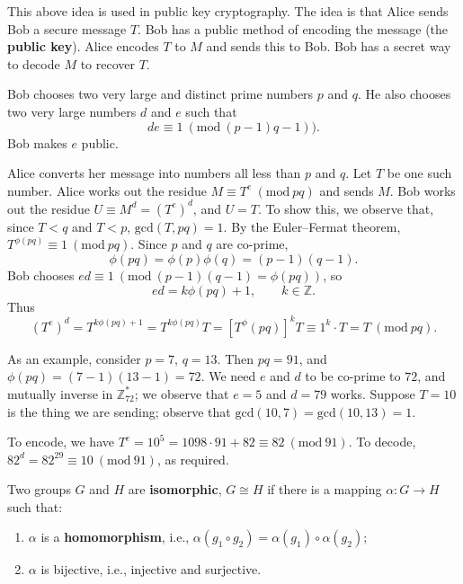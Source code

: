 \documentclass[letter-paper]{tufte-book}
\newenvironment{example}[1][Example]{\begin{trivlist}
\item[\hskip \labelsep {\bfseries #1}]}{\end{trivlist}}
\newcommand\Def[1]{\textbf{#1}}
\begin{document}
\begin{example}[Example: public key cryptography]
  This above idea is used in public key cryptography. The idea is that Alice
  sends Bob a secure message $T$. Bob has a public method of encoding the
  message (the \Def{public key}). Alice encodes $T$ to $M$ and sends this to
  Bob. Bob has a secret way to decode $M$ to recover $T$.
  
  Bob chooses two very large and distinct prime numbers $p$ and $q$. He also
  chooses two very large numbers $d$ and $e$ such that
  \begin{equation*}
    de\equiv1\ (\mbox{mod}\ (p-1)q-1)).
  \end{equation*}
  Bob makes $e$ public.
  
  Alice converts her message into numbers all less than $p$ and $q$. Let $T$ be
  one such number. Alice works out the residue $M\equiv T^e\ (\mbox{mod}\ pq)$
  and sends $M$. Bob works out the residue $U\equiv M^d=(T^e)^d$, and $U=T$. To
  show this, we observe that, since $T<q$ and $T<p$, $\mbox{gcd}(T,pq)=1$. By
  the Euler--Fermat theorem, $T^{\phi(pq)}\equiv1\ (\mbox{mod}\ pq)$. Since $p$
  and $q$ are co-prime,
  \begin{equation*}
    \phi(pq)=\phi(p)\phi(q)=(p-1)(q-1).
  \end{equation*}
  Bob chooses $ed\equiv 1\ (\mbox{mod}\ (p-1)(q-1)=\phi(pq))$, so
  \begin{equation*}
    ed=k\phi(pq)+1,\qquad k\in\mathbb{Z}.
  \end{equation*}
  Thus
  \begin{equation*}
    (T^e)^d=T^{k\phi(pq)+1}=T^{k\phi(pq)}T=[T^\phi(pq)]^k T\equiv
    1^k\cdot T=T\ (\mbox{mod}\ pq).
  \end{equation*}
  
  As an example, consider $p=7$, $q=13$. Then $pq=91$, and
  $\phi(pq)=(7-1)(13-1)=72$. We need $e$ and $d$ to be co-prime to $72$, and
  mutually inverse in $\mathbb{Z}_{72}^*$; we observe that $e=5$ and $d=79$
  works. Suppose $T=10$ is the thing we are sending; observe that
  $\mbox{gcd}(10,7)=\mbox{gcd}(10,13)=1$.
  
  To encode, we have $T^e=10^5=1098\cdot91+82\equiv82\ (\mbox{mod}\ 91)$. To
  decode, $82^d=82^29\equiv10\ (\mbox{mod}\ 91)$, as required.
\end{example}

Two groups $G$ and $H$ are \Def{isomorphic}, $G\cong H$ if there is a
mapping
$\alpha:G\rightarrow H$ such that:
\begin{enumerate}
  \item $\alpha$ is a \Def{homomorphism}, i.e., $\alpha(g_1 \circ
  g_2)=\alpha(g_1)\circ\alpha(g_2)$;
  \item $\alpha$ is bijective, i.e., injective and surjective.
\end{enumerate}
\end{document}
